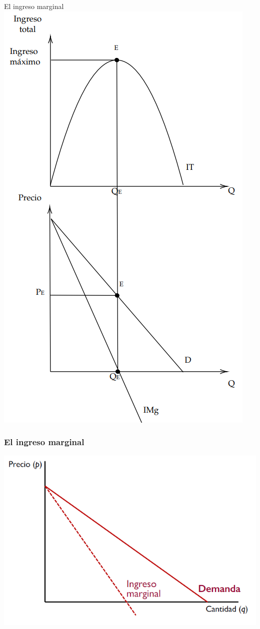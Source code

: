 \documentclass{beamer}
\begin{document}
\begin{frame}{El ingreso marginal}
    \centering
    \includegraphics[scale=0.45]{../Figures/C22.4.png}
\end{frame}

\begin{frame}
\frametitle{El ingreso marginal}
\includegraphics[scale=0.6]{../Figures/Tema_06.33_ingresomarginal.png}
\end{frame}
\end{document}
